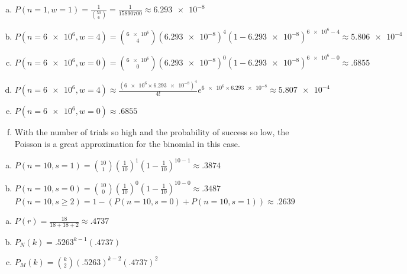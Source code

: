 \documentclass[12pt]{article}
\newenvironment{problem}[2][Problem]{\begin{trivlist}
\item[\hskip \labelsep {\bfseries #1}\hskip \labelsep {\bfseries #2.}]
  \vspace{1 cm}
}{\end{trivlist}}
\begin{document}
\begin{problem}{2.61}
\item
  \begin{enumerate}[a.]
    \item %
      $P(n=1,w=1) = \frac{1}{\binom{50}{6}} = \frac{1}{15890700} \approx \num{6.293e-8}$
    \item %
      $P(n=\num{6e6},w=4) = \binom{\num{6e6}}{4} (\num{6.293e-8})^4 (1-\num{6.293e-8})^{\num{6e6}-4} \approx \num{5.806e-4}$
    \item %
      $P(n=\num{6e6},w=0) = \binom{\num{6e6}}{0} (\num{6.293e-8})^0 (1-\num{6.293e-8})^{\num{6e6}-0} \approx .6855$
    \item %
      $P(n=\num{6e6},w=4) 
      \approx \frac{(\num{6e6}\times\num{6.293e-8})^4}{4!}e^{\num{6e6}\times\num{6.293e-8}} 
      \approx \num{5.807e-4}$ 
    \item %
      $P(n=\num{6e6},w=0) \approx .6855$
    \item %
      With the number of trials so high and the probability of success so low,
      the Poisson is a great approximation for the binomial in this case. 
  \end{enumerate}
\end{problem}

\begin{problem}{2.63} 
\item
  \begin{enumerate}[a.]
    \item %
      $P(n=10,s=1) = \binom{10}{1}(\frac{1}{10})^1(1-\frac{1}{10})^{10-1} \approx .3874$
    \item %
      $P(n=10,s=0) = \binom{10}{0}(\frac{1}{10})^0(1-\frac{1}{10})^{10-0} \approx .3487$ \\
      $P(n=10,s\geq2) = 1 - (P(n=10,s=0) + P(n=10,s=1)) \approx .2639$
  \end{enumerate}
\end{problem}

\begin{problem}{2.65}
\item
  \begin{enumerate}[a.]
    \item %
     $P(r) = \frac{18}{18+18+2} \approx .4737$
   \item %
     $P_N(k) = .5263^{k-1}(.4737)$
   \item %
     $P_M(k) = \binom{k}{2}(.5263)^{k-2}(.4737)^2$
  \end{enumerate}
\end{problem}
\end{document}
